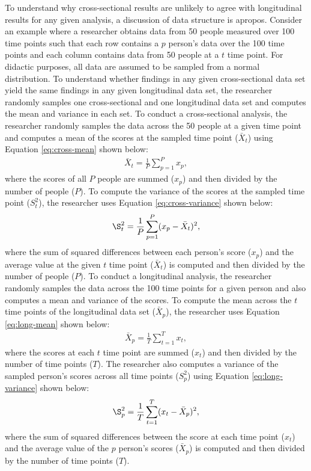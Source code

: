 \documentclass[
12pt, %
twoside,
english]{guelphthesis}
\theoremstyle{definition}
\theoremstyle{definition}
\theoremstyle{definition}
\theoremstyle{definition}
\theoremstyle{remark}
\begin{document}
To understand why cross-sectional results are unlikely to agree with longitudinal results for any given analysis, a discussion of data structure is apropos. Consider an example where a researcher obtains data from 50 people measured over 100 time points such that each row contains a \(p\) person's data over the 100 time points and each column contains data from 50 people at a \(t\) time point. For didactic purposes, all data are assumed to be sampled from a normal distribution. To understand whether findings in any given cross-sectional data set yield the same findings in any given longitudinal data set, the researcher randomly samples one cross-sectional and one longitudinal data set and computes the mean and variance in each set. To conduct a cross-sectional analysis, the researcher randomly samples the data across the 50 people at a given time point and computes a mean of the scores at the sampled time point (\(\bar{X}_t\)) using Equation \ref{eq:cross-mean} shown below:
\begin{align}
\bar{X}_t = \frac{1}{P}\sum^P_{p = 1} x_p,
\label{eq:cross-mean}
\end{align}
\noindent where the scores of all \(P\) people are summed (\(x_p\)) and then divided by the number of people (\(P\)). To compute the variance of the scores at the sampled time point (\(S^2_t\)), the researcher uses Equation \ref{eq:cross-variance} shown below:
\begin{align}
\S^2_t = \frac{1}{P}\sum^P_{p = 1} (x_p - \bar{X}_t)^2,
\label{eq:cross-variance}
\end{align}
\noindent where the sum of squared differences between each person's score (\(x_p\)) and the average value at the given \(t\) time point (\(\bar{X}_t\)) is computed and then divided by the number of people (\(P\)). To conduct a longitudinal analysis, the researcher randomly samples the data across the 100 time points for a given person and also computes a mean and variance of the scores. To compute the mean across the \(t\) time points of the longitudinal data set (\(\bar{X}_p\)), the researcher uses Equation \ref{eq:long-mean} shown below:
\begin{align}
\bar{X}_p = \frac{1}{T}\sum^T_{t = 1} x_t,
\label{eq:long-mean}
\end{align}
\noindent where the scores at each \(t\) time point are summed (\(x_t\)) and then divided by the number of time points (\(T\)). The researcher also computes a variance of the sampled person's scores across all time points (\(S^2_p\)) using Equation \ref{eq:long-variance} shown below:
\begin{align}
\S^2_p = \frac{1}{T}\sum^T_{t = 1} (x_t - \bar{X}_p)^2,
\label{eq:long-variance}
\end{align}
\noindent where the sum of squared differences between the score at each time point (\(x_t\)) and the average value of the \(p\) person's scores (\(\bar{X}_p\)) is computed and then divided by the number of time points (\(T\)).
\end{document}

